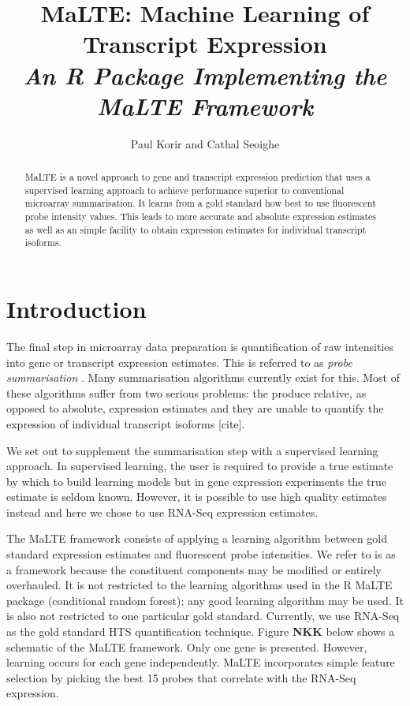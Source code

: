 \documentclass[a4paper,12pt]{article}
\author{Paul Korir and Cathal Seoighe}
\title{\textbf{MaLTE: Machine Learning of Transcript Expression}\\\textit{An \textsf{R} Package Implementing the MaLTE Framework}}
\date{}
\begin{document}
\maketitle

\tableofcontents

\newpage

\begin{abstract}
MaLTE is a novel approach to gene and transcript expression prediction that uses a supervised learning approach to achieve performance superior to conventional microarray summarisation. It learns from a gold standard how best to use fluorescent probe intensity values. This leads to more accurate and absolute expression estimates as well as an simple facility to obtain expression estimates for individual transcript isoforms.
\end{abstract}

\section{Introduction}
\label{introduction}
The final step in microarray data preparation is quantification of raw intensities into gene or transcript expression estimates. This is referred to as \textit{probe summarisation} \cite{irizarry2003summaries}. Many summarisation algorithms currently exist for this. Most of these algorithms suffer from two serious problems: the produce relative, as opposed to absolute, expression estimates \cite{irizarry2005multiple, fu2009estimating} and they are unable to quantify the expression of individual transcript isoforms [cite].

We set out to supplement the summarisation step with a supervised learning approach. In supervised learning, the user is required to provide a true estimate by which to build learning models but in gene expression experiments the true estimate is seldom known. However, it is possible to use high quality estimates instead and here we chose to use RNA-Seq expression estimates.

The \textsf{MaLTE} framework consists of applying a learning algorithm between gold standard expression estimates and fluorescent probe intensities. We refer to is as a framework because the constituent components may be modified or entirely overhauled. It is not restricted to the learning algorithms used in the \textsf{R} \textsf{MaLTE} package (conditional random forest); any good learning algorithm may be used. It is also not restricted to one particular gold standard. Currently, we use RNA-Seq as the gold standard HTS quantification technique. Figure \textbf{NKK} below shows a schematic of the \textsf{MaLTE} framework. Only one gene is presented. However, learning occurs for each gene independently. \textsf{MaLTE} incorporates simple feature selection by picking the best 15 probes that correlate with the RNA-Seq expression.
\end{document}
